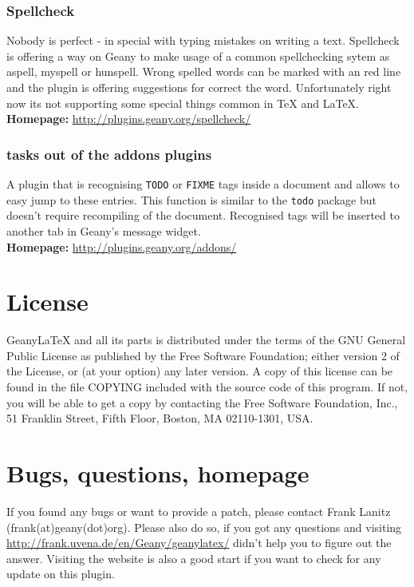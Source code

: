 \documentclass[%
paper=a4,%
fontsize=11pt,%
twoside=false,%
DIV18,
headsepline,
plainheadsepline,
footsepline,
plainfootsepline,
bibliography=totoc,%
listof=totoc,%
BCOR10mm,%
parskip=half,%
openany,%
]{scrartcl}
\begin{document}
\subsubsection{Spellcheck}
Nobody is perfect - in special with typing mistakes on writing a
text. Spellcheck is offering a way on Geany to make usage of a
common spellchecking sytem as aspell, myspell or hunspell. Wrong
spelled words can be marked with an red line and the plugin is
offering suggestions for correct the word. Unfortunately right now
its not supporting some special things common in \TeX{} and \LaTeX{}.\\
\textbf{Homepage:} \url{http://plugins.geany.org/spellcheck/}

\subsubsection{tasks out of the addons plugins}
A plugin that is recognising \texttt{TODO} or \texttt{FIXME} tags
inside a document and allows to easy jump to these entries. This
function is similar to the \texttt{todo} package but doesn't require
recompiling of the document. Recognised tags will be inserted to
another tab in Geany's message widget.\\
\textbf{Homepage:} \url{http://plugins.geany.org/addons/}

\section{License}
Geany\LaTeX{} and all its parts is distributed under the terms of the
GNU General Public License as published by the Free Software
Foundation; either version 2 of the License, or (at your option) any
later version. A copy of this license can be found in the file COPYING
included with the source code of this program. If not, you will be
able to get a copy by contacting the Free Software Foundation, Inc.,
51 Franklin Street, Fifth Floor, Boston, MA 02110-1301, USA.


\section{Bugs, questions, homepage}
\label{contact}
If you found any bugs or want to provide a patch, please contact Frank
Lanitz (frank(at)geany(dot)org). Please also do so, if you got any
questions and visiting \\ \url{http://frank.uvena.de/en/Geany/geanylatex/}
didn't help you to figure out the answer. Visiting the website is also
a good start if you want to check for any update on this plugin.
\end{document}
